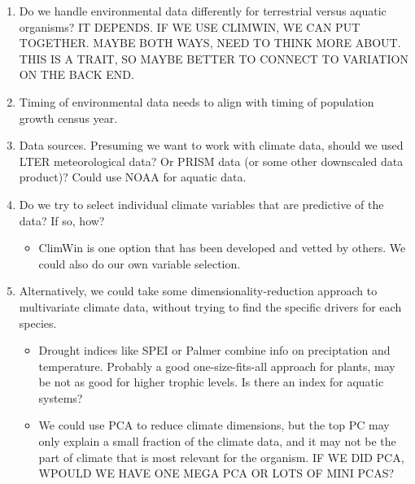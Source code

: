 \documentclass{article}
\begin{document}
\begin{enumerate}
\begin{enumerate}
\item{Do we handle environmental data differently for terrestrial versus aquatic organisms? IT DEPENDS. IF WE USE CLIMWIN, WE CAN PUT TOGETHER. MAYBE BOTH WAYS, NEED TO THINK MORE ABOUT. THIS IS A TRAIT, SO MAYBE BETTER TO CONNECT TO VARIATION ON THE BACK END.}

\item{Timing of environmental data needs to align with timing of population growth census year.}

\item{Data sources. Presuming we want to work with climate data, should we used LTER meteorological data? Or PRISM data (or some other downscaled data product)? Could use NOAA for aquatic data.}

\item{Do we try to select individual climate variables that are predictive of the data? If so, how?}
\begin{itemize}
\item{ClimWin is one option that has been developed and vetted by others. We could also do our own variable selection.}
\end{itemize}
\item{Alternatively, we could take some dimensionality-reduction approach to multivariate climate data, without trying to find the specific drivers for each species.}
\begin{itemize}
\item{Drought indices like SPEI or Palmer combine info on preciptation and temperature. Probably a good one-size-fits-all approach for plants, may be not as good for higher trophic levels. Is there an index for aquatic systems?}
\item{We could use PCA to reduce climate dimensions, but the top PC may only explain a small fraction of the climate data, and it may not be the part of climate that is most relevant for the organism. IF WE DID PCA, WPOULD WE HAVE ONE MEGA PCA OR LOTS OF MINI PCAS?}
\end{itemize}
\end{enumerate}
\end{enumerate}
\end{document}
